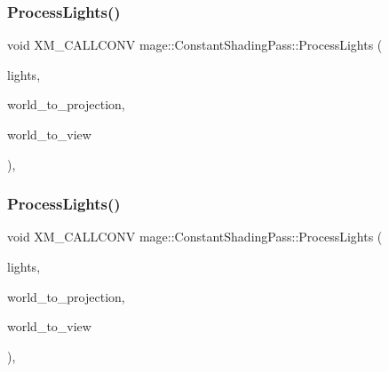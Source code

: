 \subsubsection{\texorpdfstring{Process\+Lights()}{ProcessLights()}\hspace{0.1cm}{\footnotesize\ttfamily [2/3]}}
{\footnotesize\ttfamily void X\+M\+\_\+\+C\+A\+L\+L\+C\+O\+NV mage\+::\+Constant\+Shading\+Pass\+::\+Process\+Lights (\begin{DoxyParamCaption}\item[{const vector$<$ const \hyperlink{namespacemage_a1724c6e6b6b5ba535cdd967cbbb4a669}{Omni\+Light\+Node} $\ast$ $>$ \&}]{lights,  }\item[{F\+X\+M\+M\+A\+T\+R\+IX}]{world\+\_\+to\+\_\+projection,  }\item[{F\+X\+M\+M\+A\+T\+R\+IX}]{world\+\_\+to\+\_\+view }\end{DoxyParamCaption})\hspace{0.3cm}{\ttfamily [private]}, {\ttfamily [noexcept]}}

\hypertarget{classmage_1_1_constant_shading_pass_a43b925392237991e2492f23dd35f3457}{}\label{classmage_1_1_constant_shading_pass_a43b925392237991e2492f23dd35f3457} 
\subsubsection{\texorpdfstring{Process\+Lights()}{ProcessLights()}\hspace{0.1cm}{\footnotesize\ttfamily [3/3]}}
{\footnotesize\ttfamily void X\+M\+\_\+\+C\+A\+L\+L\+C\+O\+NV mage\+::\+Constant\+Shading\+Pass\+::\+Process\+Lights (\begin{DoxyParamCaption}\item[{const vector$<$ const \hyperlink{namespacemage_aeed5dee4ff6c591eabb0e9114256df4a}{Spot\+Light\+Node} $\ast$ $>$ \&}]{lights,  }\item[{F\+X\+M\+M\+A\+T\+R\+IX}]{world\+\_\+to\+\_\+projection,  }\item[{F\+X\+M\+M\+A\+T\+R\+IX}]{world\+\_\+to\+\_\+view }\end{DoxyParamCaption})\hspace{0.3cm}{\ttfamily [private]}, {\ttfamily [noexcept]}}

\hypertarget{classmage_1_1_constant_shading_pass_a74efecf100ea18251d9e5acde63dd242}{}\label{classmage_1_1_constant_shading_pass_a74efecf100ea18251d9e5acde63dd242} 
